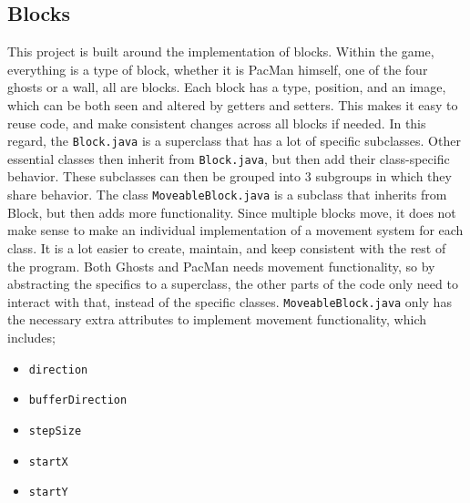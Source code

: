 \documentclass[a4paper,5pt]{article}
\begin{document}
\newpage
\subsection{Blocks}
This project is built around the implementation of blocks. Within the game, everything is a type of block, whether it is PacMan himself, one of the four ghosts or a wall, all are blocks. Each block has a type, position, and an image, which can be both seen and altered by getters and setters. This makes it easy to reuse code, and make consistent changes across all blocks if needed. In this regard, the \texttt{Block.java} is a superclass that has a lot of specific subclasses. Other essential classes then inherit from \texttt{Block.java}, but then add their class-specific behavior. These subclasses can then be grouped into 3 subgroups in which they share behavior. The class \texttt{MoveableBlock.java} is a subclass that inherits from Block, but then adds more functionality. Since multiple blocks move, it does not make sense to make an individual implementation of a movement system for each class. It is a lot easier to create, maintain, and keep consistent with the rest of the program. Both Ghosts and PacMan needs movement functionality, so by abstracting the specifics to a superclass, the other parts of the code only need to interact with that, instead of the specific classes. \texttt{MoveableBlock.java} only has the necessary extra attributes to implement movement functionality, which includes;
\begin{itemize}
    \item \texttt{direction}
    \item \texttt{bufferDirection}
    \item \texttt{stepSize}
    \item \texttt{startX}
    \item \texttt{startY}
\end{itemize}
\end{document}
